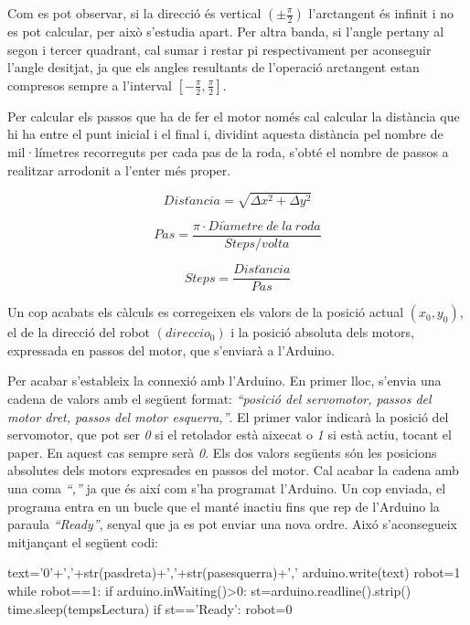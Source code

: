 Com es pot observar, si la direcció és vertical $(\pm\frac{\pi}{2})$  l’arctangent és infinit i no es pot calcular, per això s’estudia apart. Per altra banda, si l’angle pertany al segon i tercer quadrant, cal sumar i restar pi respectivament per aconseguir l’angle desitjat, ja que els angles resultants de l’operació arctangent estan compresos sempre a l’interval $[-\frac{\pi}{2}, \frac{\pi}{2}]$.

Per calcular els passos que ha de fer el motor només cal calcular la distància que hi ha entre el punt inicial i el final i, dividint aquesta distància pel nombre de mil·límetres recorreguts per cada pas de la roda, s’obté el nombre de passos a realitzar arrodonit a l'enter més proper. 

\begin{equation}\label{eq:dist}
Dist\grave{a}ncia=\sqrt{\Delta x^2+ \Delta y^2}
\end{equation}

\begin{equation}\label{eq:pas}
Pas=\frac{\pi\cdot Di\grave{a}metre \ de \ la \ roda}{Steps/volta}
\end{equation}

\begin{equation}\label{eq:steps}
Steps=\frac{Dist\grave{a}ncia}{Pas}
\end{equation}


Un cop acabats els càlculs es corregeixen els valors de la posició actual $(x_{0},y_{0})$, el de la direcció del robot $(direccio_{0})$ i la posició absoluta dels motors, expressada en passos del motor, que s’enviarà a l'Arduino. 

Per acabar s’estableix la connexió amb l’Arduino. En primer lloc, s’envia una cadena de valors amb el següent format: \emph{“posició del servomotor, passos del motor dret, passos del motor esquerra,”}. El primer valor indicarà la posició del servomotor, que pot ser \emph{0} si el retolador està aixecat o \emph{1} si està actiu, tocant el paper. En aquest cas sempre serà \emph{0}. Els dos valors següents són les posicions absolutes dels motors expresades en passos del motor. Cal acabar la cadena amb una coma \emph{“,”} ja que és així com s’ha programat l’Arduino. Un cop enviada, el programa entra en un bucle que el manté inactiu fins que rep de l’Arduino la paraula \emph{“Ready”}, senyal que ja es pot enviar una nova ordre. Aixó s’aconsegueix mitjançant el següent codi:

\begin{python}
	text='0'+','+str(pasdreta)+','+str(pasesquerra)+','
	arduino.write(text)
	robot=1
	while robot==1:
	if arduino.inWaiting()>0:
	st=arduino.readline().strip()
	time.sleep(tempsLectura)
	if st=='Ready':
	robot=0
\end{python}

